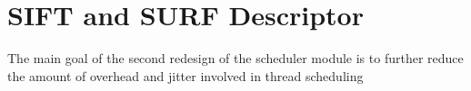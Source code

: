 \section{SIFT and SURF Descriptor}
\label{sec:build2}
The main goal of the second redesign of the scheduler module is to further
reduce the amount of overhead and jitter involved in thread scheduling
